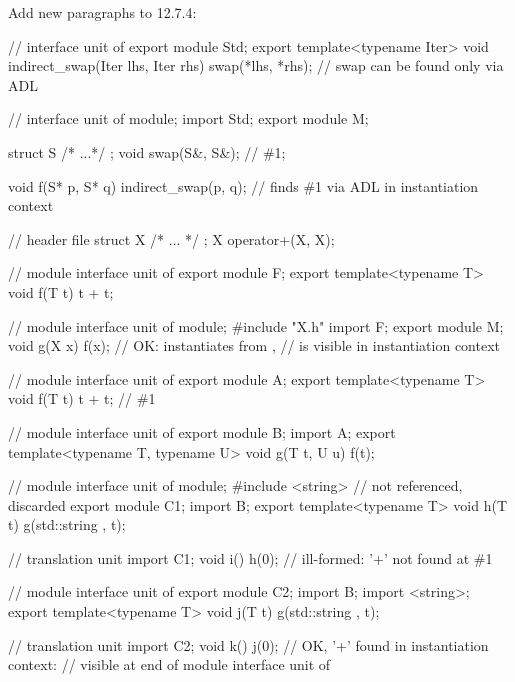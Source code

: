 \noindent
Add new paragraphs to 12.7.4:
\begin{std.txt}
\color{addclr}
\pnum
\enterexample
\begin{codeblock}
// interface unit of 
export module Std;
export template<typename Iter>
void indirect_swap(Iter lhs, Iter rhs)
{
  swap(*lhs, *rhs);     // swap can be found only via ADL
}

// interface unit of 
module;
import Std;
export module M;

struct S { /* ...*/ };
void swap(S&, S&);      // \#1;

void f(S* p, S* q)
{
  indirect_swap(p, q);  // finds \#1 via ADL in instantiation context
}
\end{codeblock}
\exitexample

\pnum
\enterexample
\begin{codeblock}
// header file 
struct X { /* ... */ };
X operator+(X, X);

// module interface unit of 
export module F;
export template<typename T>
void f(T t) {
  t + t;
}

// module interface unit of 
module;
#include "X.h"
import F;
export module M;
void g(X x) {
  f(x);             // OK: instantiates  from ,
                    //  is visible in instantiation context
}
\end{codeblock}
\exitexample

\pnum
\enterexample
\begin{codeblock}
// module interface unit of 
export module A;
export template<typename T>
void f(T t) {
  t + t;           // \#1
}

// module interface unit of 
export module B;
import A;
export template<typename T, typename U>
void g(T t, U u) {
  f(t);
}

// module interface unit of 
module;
#include <string>   //  not referenced, discarded
export module C1;
import B;
export template<typename T>
void h(T t) {
  g(std::string{ }, t);
}

// translation unit
import C1;
void i() {
   h(0);        // ill-formed: '+' not found at \#1
}

// module interface unit of 
export module C2;
import B;
import <string>;
export template<typename T>
void j(T t) {
  g(std::string{ }, t);
}

// translation unit
import C2;
void k() {
   j(0);        // OK, '+' found in instantiation context:
                // visible at end of module interface unit of 
}
\end{codeblock}
\exitexample
\end{std.txt}

